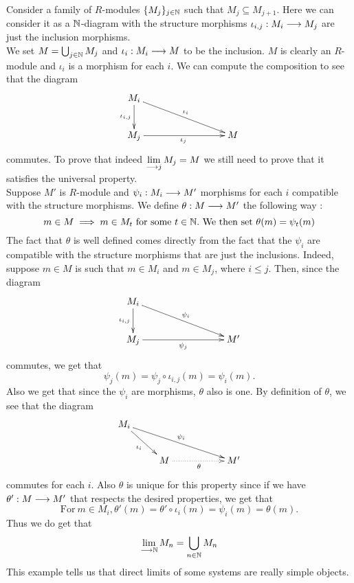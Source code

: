 \documentclass[11pt, a4paper, twoside]{article}
\begin{document}
\begin{example}
Consider a family of $R$-modules $\{M_j\}_{j\in\mathbb{N}}$ such that $M_j\subseteq M_{j+1}$. Here we can consider it as a $\mathbb{N}$-diagram with the structure morphisms $\iota_{i,j}:M_i\longrightarrow M_j$ are just the inclusion morphisms.\\
We set $M=\bigcup_{j\in\mathbb{N}}M_j$ and $\iota_i:M_i\longrightarrow M$ to be the inclusion. $M$ is clearly an $R$-module and $\iota_i$ is a morphism for each $i$. We can compute the composition to see that the diagram 
\begin{displaymath}
    \xymatrix{
        M_i\ar[d]_{\iota_{i,j}}\ar[rrrd]^{\iota_i}\\
        M_j\ar[rrr]_{\iota_j} & & &  M\\
    }
\end{displaymath}
commutes. To prove that indeed $\lim\limits_{\longrightarrow j}M_j=M$ we still need to prove that it satisfies the universal property.\\
Suppose $M'$ is $R$-module and $\psi_i:M_i\longrightarrow M'$ morphisms for each $i$ compatible with the structure morphisms. We define $\theta:M\longrightarrow M'$ the following way : 
\begin{displaymath}
    m\in M\implies m\in M_t\ \mathrm{for\ some}\ t\in\N.\ \mathrm{We\ then\ set}\ \theta(m)=\psi_t(m)
\end{displaymath}
The fact that $\theta$ is well defined comes directly from the fact that the $\psi_i$ are compatible with the structure morphisms that are just the inclusions. Indeed, suppose $m\in M$ is such that $m\in M_i$ and $m\in M_j$, where $i\leq j$. Then, since the diagram 
\begin{displaymath}
    \xymatrix{
    M_i\ar[d]_{\iota_{i,j}}\ar[rrrd]^{\psi_i}\\
    M_j\ar[rrr]_{\psi_j} & & &  M'\\
    }
\end{displaymath}
commutes, we get that 
\begin{displaymath}
    \psi_j(m)=\psi_j\circ\iota_{i,j}(m)=\psi_i(m).
\end{displaymath}
Also we get that since the $\psi_i$ are morphisms, $\theta$ also is one. By definition of $\theta$, we see that the diagram
\begin{displaymath}
    \xymatrix{
    M_i\ar[dr]_{\iota_i}\ar[drrr]^{\psi_i}\\
    & M\ar@{.>}[rr]_\theta  & & M'
    }
\end{displaymath}
commutes for each $i$. Also $\theta$ is unique for this property since if we have $\theta':M\longrightarrow M'$ that respects the desired properties, we get that 
\begin{displaymath}
    \mathrm{For}\ m\in M_i, \theta'(m)=\theta'\circ\iota_i(m)=\psi_i(m)=\theta(m).
\end{displaymath}
Thus we do get that $$\lim\limits_{\longrightarrow\mathbb{N}}M_n=\bigcup_{n\in\mathbb{N}}M_n$$
This example tells us that direct limits of some systems are really simple objects.
\end{example}
\end{document}
